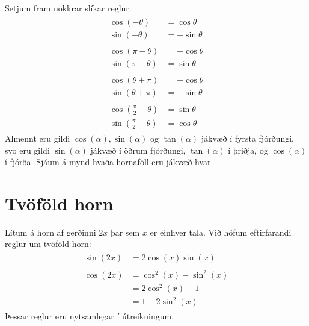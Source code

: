 \documentclass[a4paper,10pt,icelandic]{sphinxmanual}
\begin{document}
Setjum fram nokkrar slíkar reglur.
\begin{equation*}
\begin{split}\begin{aligned}
\cos(-\theta)&=\cos \theta\\
\sin(-\theta)&=-\sin\theta\\
& \\
\cos(\pi-\theta)&=-\cos \theta\\
\sin(\pi-\theta)&=\sin \theta\\
& \\
\cos(\theta+\pi)&=-\cos \theta\\
\sin(\theta+\pi)&=-\sin \theta\\
& \\
\cos\left(\frac{\pi}{2}-\theta\right)&=\sin\theta\\
\sin\left(\frac{\pi}{2}-\theta\right)&=\cos\theta
\end{aligned}\end{split}
\end{equation*}
Almennt eru gildi \(\cos(\alpha), \sin(\alpha)\) og \(\tan(\alpha)\) jákvæð í fyrsta fjórðungi, svo eru gildi \(\sin(\alpha)\) jákvæð í öðrum fjórðungi, \(\tan(\alpha)\) í þriðja, og \(\cos(\alpha)\) í fjórða. Sjáum á mynd hvaða hornaföll eru jákvæð hvar.



\section{Tvöföld horn}
\label{\detokenize{Kafli07:tvofold-horn}}
Lítum á horn af gerðinni \(2x\) þar sem \(x\) er einhver tala. Við höfum eftirfarandi reglur um tvöföld horn:
\begin{equation*}
\begin{split}\begin{aligned}
\sin(2x)&=2 \cos(x) \sin(x) \\
\quad\\
\cos(2x)&= \cos^2(x)-\sin^2(x) \\
&= 2\cos^2(x)-1 \\
&= 1-2 \sin^2(x)
\end{aligned}\end{split}
\end{equation*}
Þessar reglur eru nytsamlegar í útreikningum.
\end{document}
